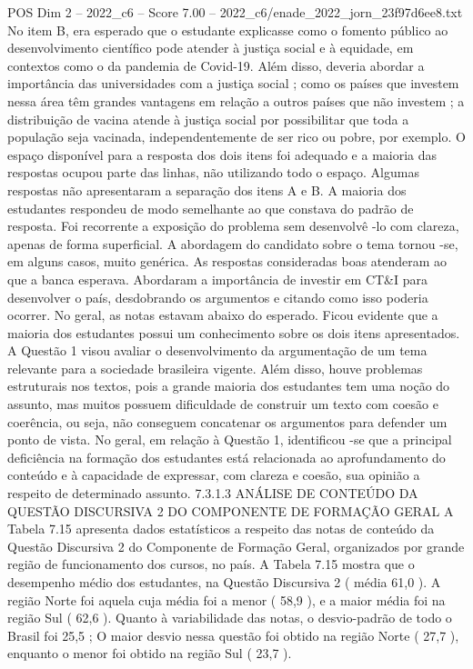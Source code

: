 \begin{textsample}{POS Dim 2 – 2022\_c6 – Score 7.00 – 2022\_c6/enade\_2022\_jorn\_23f97d6ee8.txt}
No item B, era esperado que o estudante explicasse como o fomento público ao desenvolvimento científico pode atender à justiça social e à equidade, em contextos como o da pandemia de Covid-19.
Além disso, deveria abordar a importância das universidades com a justiça social ; como os países que investem nessa área têm grandes vantagens em relação a outros países que não investem ; a distribuição de vacina atende à justiça social por possibilitar que toda a população seja vacinada, independentemente de ser rico ou pobre, por exemplo.
O espaço disponível para a resposta dos dois itens foi adequado e a maioria das respostas ocupou parte das linhas, não utilizando todo o espaço.
Algumas respostas não apresentaram a separação dos itens A e B.
A maioria dos estudantes respondeu de modo semelhante ao que constava do padrão de resposta.
Foi recorrente a exposição do problema sem desenvolvê -lo com clareza, apenas de forma superficial.
A abordagem do candidato sobre o tema tornou -se, em alguns casos, muito genérica.
As respostas consideradas boas atenderam ao que a banca esperava.
Abordaram a importância de investir em CT\&I para desenvolver o país, desdobrando os argumentos e citando como isso poderia ocorrer.
No geral, as notas estavam abaixo do esperado.
Ficou evidente que a maioria dos estudantes possui um conhecimento sobre os dois itens apresentados.
A Questão 1 visou avaliar o desenvolvimento da argumentação de um tema relevante para a sociedade brasileira vigente.
Além disso, houve problemas estruturais nos textos, pois a grande maioria dos estudantes tem uma noção do assunto, mas muitos possuem dificuldade de construir um texto com coesão e coerência, ou seja, não conseguem concatenar os argumentos para defender um ponto de vista.
No geral, em relação à Questão 1, identificou -se que a principal deficiência na formação dos estudantes está relacionada ao aprofundamento do conteúdo e à capacidade de expressar, com clareza e coesão, sua opinião a respeito de determinado assunto. 7.3.1.3 ANÁLISE DE CONTEÚDO DA QUESTÃO DISCURSIVA 2 DO COMPONENTE DE FORMAÇÃO GERAL A Tabela 7.15 apresenta dados estatísticos a respeito das notas de conteúdo da Questão Discursiva 2 do Componente de Formação Geral, organizados por grande região de funcionamento dos cursos, no país.
A Tabela 7.15 mostra que o desempenho médio dos estudantes, na Questão Discursiva 2 ( média 61,0 ).
A região Norte foi aquela cuja média foi a menor ( 58,9 ), e a maior média foi na região Sul ( 62,6 ).
Quanto à variabilidade das notas, o desvio-padrão de todo o Brasil foi 25,5 ; O maior desvio nessa questão foi obtido na região Norte ( 27,7 ), enquanto o menor foi obtido na região Sul ( 23,7 ).

\end{textsample}
